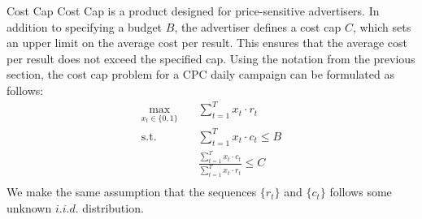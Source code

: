 \documentclass[../main.tex]{subfiles}
\begin{document}
	\begin{section}{Cost Cap}
	Cost Cap is a product designed for price-sensitive advertisers. In addition to specifying a budget $B$, the advertiser defines a cost cap $C$, which sets an upper limit on the average cost per result. This ensures that the average cost per result does not exceed the specified cap. Using the notation from the previous section, the cost cap problem for a CPC daily campaign can be formulated as follows: 
	\begin{equation}  \label{eq:cost_cap}
		\begin{aligned}
			\max_{x_t \in \{0,1\}} \quad & \sum_{t=1}^T x_t \cdot r_t \\
			\text{s.t.} \quad &  \sum_{t=1}^{T} x_t \cdot c_t \leq B \\
			& \frac{ \sum_{t=1}^{T} x_t \cdot c_t} { \sum_{t=1}^{T} x_t \cdot r_t } \leq C \\
 		\end{aligned}
	\end{equation}
	We make the same assumption that the sequences  \(\{r_t\}\)  and \(\{c_t\}\) follows some unknown \(i.i.d.\) distribution.
	

\end{section}
\end{document}
